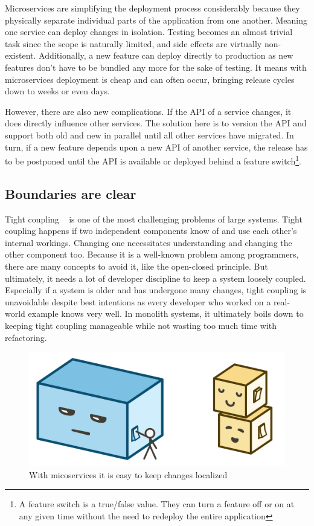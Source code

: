Microservices are simplifying the deployment process considerably because they physically separate individual parts of the application from one another. Meaning one service can deploy changes in isolation. Testing becomes an almost trivial task since the scope is naturally limited, and side effects are virtually non-existent. Additionally, a new feature can deploy directly to production as new features don't have to be bundled any more for the sake of testing. It means with microservices deployment is cheap and can often occur, bringing release cycles down to weeks or even days.

However, there are also new complications. If the API of a service changes, it does directly influence other services. The solution here is to version the API and support both old and new in parallel until all other services have migrated. In turn, if a new feature depends upon a new API of another service, the release has to be postponed until the API is available or deployed behind a feature switch\footnote{A feature switch is a true/false value. They can turn a feature off or on at any given time without the need to redeploy the entire application}.


\subsection{Boundaries are clear}

Tight coupling ~\cite{kaye.2003} is one of the most challenging problems of large systems. Tight coupling happens if two independent components know of and use each other's internal workings. Changing one necessitates understanding and changing the other component too. Because it is a well-known problem among programmers, there are many concepts to avoid it, like the open-closed principle. But ultimately, it needs a lot of developer discipline to keep a system loosely coupled. Especially if a system is older and has undergone many changes, tight coupling is unavoidable despite best intentions as every developer who worked on a real-world example knows very well. In monolith systems, it ultimately boils down to keeping tight coupling manageable while not wasting too much time with refactoring.

\begin{figure}[ht]
  \centering
  \includegraphics[width=0.55\linewidth]{assets/illustration-setting.png}
  \caption{With micoservices it is easy to keep changes localized}
\end{figure}


